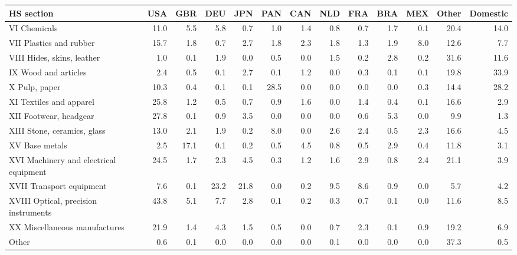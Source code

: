 \begin{tabular}{lrrrrrrrrrrrr}
\toprule
HS section & USA & GBR & DEU & JPN & PAN & CAN & NLD & FRA & BRA & MEX & Other & Domestic \\
\midrule
VI Chemicals & 11.0 & 5.5 & 5.8 & 0.7 & 1.0 & 1.4 & 0.8 & 0.7 & 1.7 & 0.1 & 20.4 & 14.0 \\
VII Plastics and rubber & 15.7 & 1.8 & 0.7 & 2.7 & 1.8 & 2.3 & 1.8 & 1.3 & 1.9 & 8.0 & 12.6 & 7.7 \\
VIII Hides, skins, leather & 1.0 & 0.1 & 1.9 & 0.0 & 0.5 & 0.0 & 1.5 & 0.2 & 2.8 & 0.2 & 31.6 & 11.6 \\
IX Wood and articles & 2.4 & 0.5 & 0.1 & 2.7 & 0.1 & 1.2 & 0.0 & 0.3 & 0.1 & 0.1 & 19.8 & 33.9 \\
X Pulp, paper & 10.3 & 0.4 & 0.1 & 0.1 & 28.5 & 0.0 & 0.0 & 0.0 & 0.0 & 0.3 & 14.4 & 28.2 \\
XI Textiles and apparel & 25.8 & 1.2 & 0.5 & 0.7 & 0.9 & 1.6 & 0.0 & 1.4 & 0.4 & 0.1 & 16.6 & 2.9 \\
XII Footwear, headgear & 27.8 & 0.1 & 0.9 & 3.5 & 0.0 & 0.0 & 0.0 & 0.6 & 5.3 & 0.0 & 9.9 & 1.3 \\
XIII Stone, ceramics, glass & 13.0 & 2.1 & 1.9 & 0.2 & 8.0 & 0.0 & 2.6 & 2.4 & 0.5 & 2.3 & 16.6 & 4.5 \\
XV Base metals & 2.5 & 17.1 & 0.1 & 0.2 & 0.5 & 4.5 & 0.8 & 0.5 & 2.9 & 0.4 & 11.8 & 3.1 \\
XVI Machinery and electrical equipment & 24.5 & 1.7 & 2.3 & 4.5 & 0.3 & 1.2 & 1.6 & 2.9 & 0.8 & 2.4 & 21.1 & 3.9 \\
XVII Transport equipment & 7.6 & 0.1 & 23.2 & 21.8 & 0.0 & 0.2 & 9.5 & 8.6 & 0.9 & 0.0 & 5.7 & 4.2 \\
XVIII Optical, precision instruments & 43.8 & 5.1 & 7.7 & 2.8 & 0.1 & 0.2 & 0.3 & 0.7 & 0.1 & 0.0 & 11.6 & 8.5 \\
XX Miscellaneous manufactures & 21.9 & 1.4 & 4.3 & 1.5 & 0.5 & 0.0 & 0.7 & 2.3 & 0.1 & 0.9 & 19.2 & 6.9 \\
Other & 0.6 & 0.1 & 0.0 & 0.0 & 0.0 & 0.0 & 0.1 & 0.0 & 0.0 & 0.0 & 37.3 & 0.5 \\
\bottomrule
\end{tabular}

